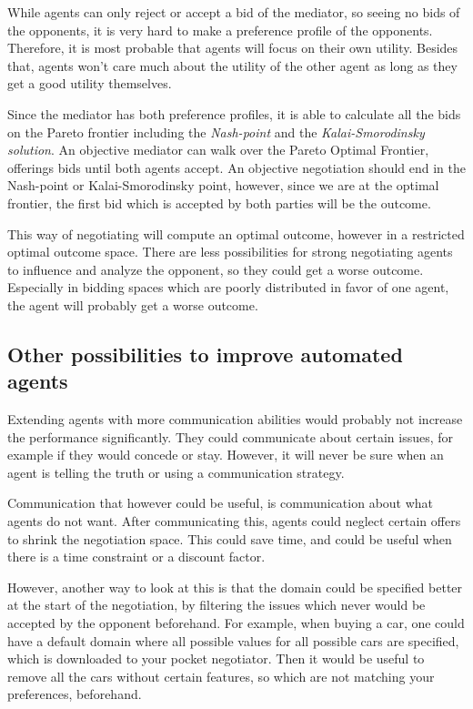 While agents can only reject or accept a bid of the mediator, so seeing no bids of the opponents, it is very hard to make a preference profile of the opponents. Therefore, it is most probable that agents will focus on their own utility. Besides that, agents won't care much about the utility of the other agent as long as they get a good utility themselves. 

Since the mediator has both preference profiles, it is able to calculate all the bids on the Pareto frontier including the \emph{Nash-point} and the \emph{Kalai-Smorodinsky solution}. An objective mediator can walk over the Pareto Optimal Frontier, offerings bids until both agents accept. An objective negotiation should end in the Nash-point or Kalai-Smorodinsky point, however, since we are at the optimal frontier, the first bid which is accepted by both parties will be the outcome.

This way of negotiating will compute an optimal outcome, however in a restricted optimal outcome space. There are less possibilities for strong negotiating agents to influence and analyze the opponent, so they could get a worse outcome. Especially in bidding spaces which are poorly distributed in favor of one agent, the agent will probably get a worse outcome.

\subsection{Other possibilities to improve automated agents}
Extending agents with more communication abilities would probably not increase the performance significantly. They could
communicate about certain issues, for example if they would concede or stay. However, it will never be sure when an agent is telling the truth or using a communication strategy. 

Communication that however could be useful, is communication about what agents do not want. After communicating this, agents could neglect certain offers to shrink the negotiation space. This could save time, and could be useful when there is a time constraint or a discount factor. 

However, another way to look at this is that the domain could be specified better at the start of the negotiation, by filtering the issues which never would be accepted by the opponent beforehand. For example, when buying a car, one could have a default domain where all possible values for all possible cars are specified, which is 
downloaded to your pocket negotiator. Then it would be useful to remove all the cars without certain features, so which are not matching your preferences, beforehand. 

